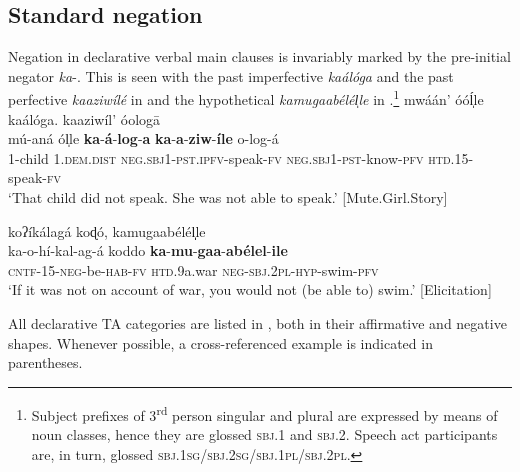 \documentclass[output=paper,colorlinks=true, citecolor=brown,draftmode]{langscibook}
\begin{document}
\subsection{Standard negation} \label{sec:cuw:2.1}
Negation in declarative verbal main clauses is invariably marked by the pre-initial negator \textit{ka}{}-. This is seen with the past imperfective \textit{kaálóga} and the past perfective \textit{kaaziwílé} in  and the hypothetical \textit{kamugaabélél̩le} in .\footnote{Subject prefixes of 3\textsuperscript{rd} person singular and plural are expressed by means of noun classes, hence they are glossed \textsc{sbj.1} and \textsc{sbj.2}. Speech act participants are, in turn, glossed \textsc{sbj.1sg/sbj.2sg/sbj.1pl/sbj.2pl}.}
\ea\label{ex:cuw:1} mwáán’ óóĺ̩le kaálóga. kaaziwíl’ óologā\\
    \gll mú-aná ól̩le \textbf{ka}{}-\textbf{á}{}-\textbf{log}{}-\textbf{a} \textbf{ka}{}-\textbf{a}{}-\textbf{ziw}{}-\textbf{íle} o-log-á\\
          1-child 1.\textsc{dem.dist} \textsc{neg.sbj1-pst.ipfv}{}-speak-\textsc{fv} \textsc{neg.sbj1-pst}{}-know-\textsc{pfv} \textsc{htd.15-}speak-\textsc{fv}\\
    \glt ‘That child did not speak. She was not able to speak.’ [Mute.Girl.Story]
\z 

\ea\label{ex:cuw:2} koʔíkálagá koɖó, kamugaabélél̩̩le \\ 
    \gll ka-o-hí-kal-ag-á koddo \textbf{ka}{}-\textbf{mu}{}-\textbf{gaa}{}-\textbf{abélel}{}-\textbf{ile}\\
          \textsc{cntf-15-neg}{}-be-\textsc{hab-fv} \textsc{htd.}9a.war \textsc{neg-sbj.2pl-hyp}{}-swim-\textsc{pfv}\\
    \glt ‘If it was not on account of war, you would not (be able to) swim.’ [Elicitation]
\z  

All declarative TA categories are listed in , both in their affirmative and negative shapes. Whenever possible, a cross-referenced example is indicated in parentheses. 
\end{document}
